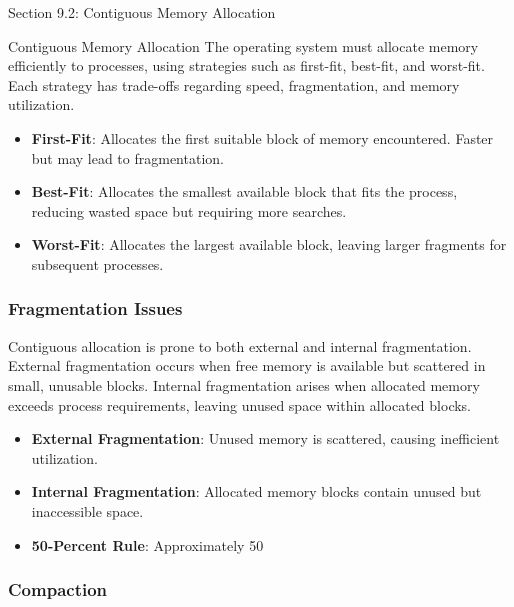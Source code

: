 \begin{notes}{Section 9.2: Contiguous Memory Allocation}
\begin{notes}{Contiguous Memory Allocation}
        The operating system must allocate memory efficiently to processes, using strategies such as first-fit, best-fit, and worst-fit. Each strategy has trade-offs regarding speed, fragmentation, 
        and memory utilization.
        
        \begin{highlight}
            \begin{itemize}
                \item \textbf{First-Fit}: Allocates the first suitable block of memory encountered. Faster but may lead to fragmentation.
                \item \textbf{Best-Fit}: Allocates the smallest available block that fits the process, reducing wasted space but requiring more searches.
                \item \textbf{Worst-Fit}: Allocates the largest available block, leaving larger fragments for subsequent processes.
            \end{itemize}
        \end{highlight}
        
        \subsubsection*{Fragmentation Issues}
        
        Contiguous allocation is prone to both external and internal fragmentation. External fragmentation occurs when free memory is available but scattered in small, unusable blocks. Internal 
        fragmentation arises when allocated memory exceeds process requirements, leaving unused space within allocated blocks.
        
        \begin{highlight}
            \begin{itemize}
                \item \textbf{External Fragmentation}: Unused memory is scattered, causing inefficient utilization.
                \item \textbf{Internal Fragmentation}: Allocated memory blocks contain unused but inaccessible space.
                \item \textbf{50-Percent Rule}: Approximately 50%
            \end{itemize}
        \end{highlight}
        
        \subsubsection*{Compaction}
        

\end{notes}
\end{notes}

